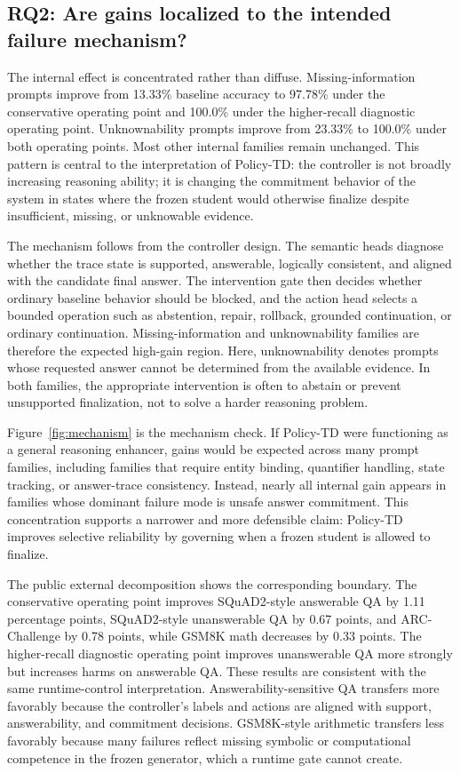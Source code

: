 \documentclass[11pt]{article}
\newcommand{\policytd}{Policy-TD}
\begin{document}
\subsection{RQ2: Are gains localized to the intended failure mechanism?}
The internal effect is concentrated rather than diffuse. Missing-information prompts improve from 13.33\% baseline accuracy to 97.78\% under the conservative operating point and 100.0\% under the higher-recall diagnostic operating point. Unknownability prompts improve from 23.33\% to 100.0\% under both operating points. Most other internal families remain unchanged. This pattern is central to the interpretation of \policytd{}: the controller is not broadly increasing reasoning ability; it is changing the commitment behavior of the system in states where the frozen student would otherwise finalize despite insufficient, missing, or unknowable evidence.

The mechanism follows from the controller design. The semantic heads diagnose whether the trace state is supported, answerable, logically consistent, and aligned with the candidate final answer. The intervention gate then decides whether ordinary baseline behavior should be blocked, and the action head selects a bounded operation such as abstention, repair, rollback, grounded continuation, or ordinary continuation. Missing-information and unknownability families are therefore the expected high-gain region. Here, unknownability denotes prompts whose requested answer cannot be determined from the available evidence. In both families, the appropriate intervention is often to abstain or prevent unsupported finalization, not to solve a harder reasoning problem.

Figure~\ref{fig:mechanism} is the mechanism check. If \policytd{} were functioning as a general reasoning enhancer, gains would be expected across many prompt families, including families that require entity binding, quantifier handling, state tracking, or answer-trace consistency. Instead, nearly all internal gain appears in families whose dominant failure mode is unsafe answer commitment. This concentration supports a narrower and more defensible claim: \policytd{} improves selective reliability by governing when a frozen student is allowed to finalize.

The public external decomposition shows the corresponding boundary. The conservative operating point improves SQuAD2-style answerable QA by 1.11 percentage points, SQuAD2-style unanswerable QA by 0.67 points, and ARC-Challenge by 0.78 points, while GSM8K math decreases by 0.33 points. The higher-recall diagnostic operating point improves unanswerable QA more strongly but increases harms on answerable QA. These results are consistent with the same runtime-control interpretation. Answerability-sensitive QA transfers more favorably because the controller's labels and actions are aligned with support, answerability, and commitment decisions. GSM8K-style arithmetic transfers less favorably because many failures reflect missing symbolic or computational competence in the frozen generator, which a runtime gate cannot create.
\end{document}
